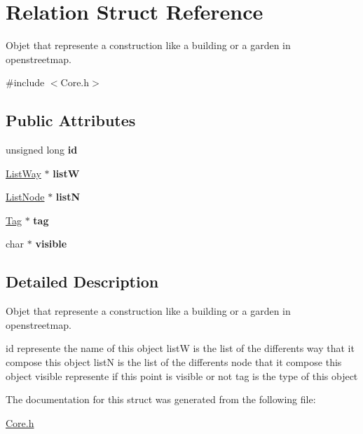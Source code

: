 \hypertarget{structRelation}{\section{Relation Struct Reference}
\label{structRelation}
}


Objet that represente a construction like a building or a garden in openstreetmap.  




{\ttfamily \#include $<$Core.\-h$>$}

\subsection*{Public Attributes}
\begin{DoxyCompactItemize}
\item 
\hypertarget{structRelation_a3f70b867d03c79bfa4dc98516ef1c25f}{unsigned long {\bfseries id}}\label{structRelation_a3f70b867d03c79bfa4dc98516ef1c25f}

\item 
\hypertarget{structRelation_a9a569cd7a800102a952b61bafe3f5fa7}{\hyperlink{structListWay}{List\-Way} $\ast$ {\bfseries list\-W}}\label{structRelation_a9a569cd7a800102a952b61bafe3f5fa7}

\item 
\hypertarget{structRelation_a55c4f77df17c7ab272ee93db476e8c8f}{\hyperlink{structListNode}{List\-Node} $\ast$ {\bfseries list\-N}}\label{structRelation_a55c4f77df17c7ab272ee93db476e8c8f}

\item 
\hypertarget{structRelation_af672e16f4fb0a93645b784e171f991d4}{\hyperlink{structTag}{Tag} $\ast$ {\bfseries tag}}\label{structRelation_af672e16f4fb0a93645b784e171f991d4}

\item 
\hypertarget{structRelation_a54cd0470aa40ddc3872899edcdd70eb1}{char $\ast$ {\bfseries visible}}\label{structRelation_a54cd0470aa40ddc3872899edcdd70eb1}

\end{DoxyCompactItemize}


\subsection{Detailed Description}
Objet that represente a construction like a building or a garden in openstreetmap. 

id represente the name of this object list\-W is the list of the differents way that it compose this object list\-N is the list of the differents node that it compose this object visible represente if this point is visible or not tag is the type of this object 

The documentation for this struct was generated from the following file\-:\begin{DoxyCompactItemize}
\item 
\hyperlink{Core_8h}{Core.\-h}\end{DoxyCompactItemize}
